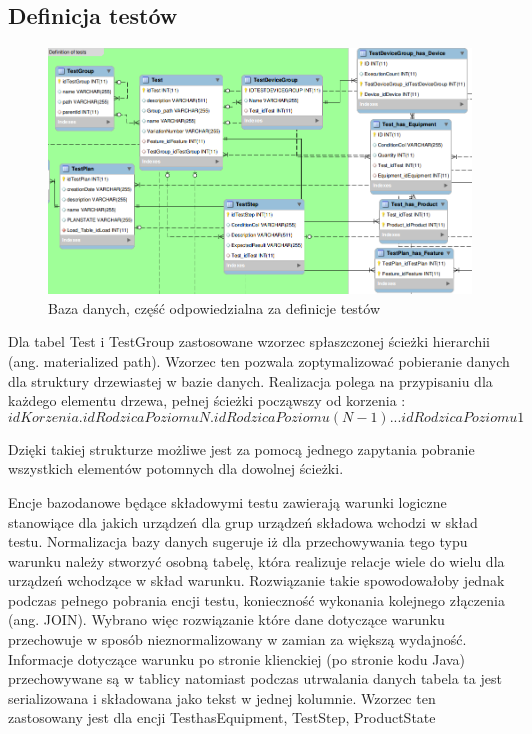  

  
 \subsection{Definicja testów}   
  \begin{figure}
\centerline{\includegraphics[scale=0.5]{img/bazaDanychDefinicja.png}}
 \label{fig:bazaTesty}
      \caption{Baza danych, część odpowiedzialna za definicje testów}
\end{figure}

 Dla tabel Test i TestGroup zastosowane wzorzec spłaszczonej ścieżki hierarchii\cite{materializedPath} (ang. materialized path). Wzorzec ten pozwala zoptymalizować pobieranie danych dla struktury drzewiastej w bazie danych. Realizacja polega na przypisaniu dla każdego elementu drzewa, pełnej ścieżki począwszy od korzenia :
 \begin{equation}
{idKorzenia}.{idRodzicaPoziomuN}.{idRodzicaPoziomu(N-1)}...{idRodzicaPoziomu1}
\end{equation}
  
  Dzięki takiej strukturze możliwe jest za pomocą jednego zapytania pobranie wszystkich elementów potomnych dla dowolnej ścieżki.
  
  Encje bazodanowe będące składowymi testu zawierają warunki logiczne stanowiące dla jakich urządzeń dla grup urządzeń składowa wchodzi w skład testu. Normalizacja bazy danych sugeruje iż dla przechowywania tego typu warunku należy stworzyć osobną tabelę, która realizuje relacje wiele do wielu dla urządzeń wchodzące w skład warunku. Rozwiązanie takie spowodowałoby jednak podczas pełnego pobrania encji testu, konieczność wykonania kolejnego złączenia (ang. JOIN). Wybrano więc rozwiązanie które dane dotyczące warunku przechowuje w sposób nieznormalizowany w zamian za większą wydajność. Informacje dotyczące warunku po stronie klienckiej (po stronie kodu Java) przechowywane są w tablicy natomiast podczas utrwalania danych tabela ta jest serializowana i składowana jako tekst w jednej kolumnie. Wzorzec ten zastosowany jest dla encji TesthasEquipment, TestStep, ProductState


